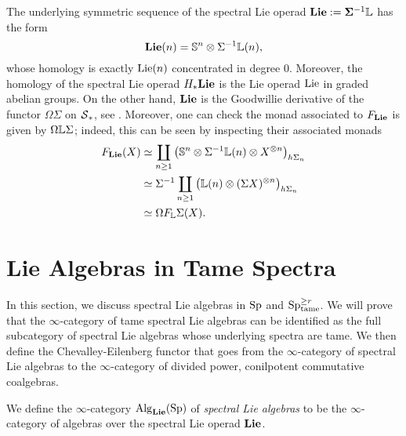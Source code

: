 \begin{remark}
\label{Remark on shifted Lie operads}
The underlying symmetric sequence of the spectral Lie operad $\mathbf{Lie}:= \mathbf{\Sigma}^{-1}{\mathbb{L}}$
	has the form 	
	$$
	\mathbf{Lie}(n)= {\mathbb{S}}^{n} \otimes \Sigma^{-1} {\mathbb{L}}(n),
	$$
	whose homology is exactly $\operatorname{Lie}(n)$ concentrated in degree $0$.
	Moreover, the homology of the spectral Lie operad $H_{*}\mathbf{Lie}$ is the Lie operad $\operatorname{Lie}$ in graded abelian groups.
	On the other hand, $\mathbf{Lie}$ is the Goodwillie derivative of the functor $\Omega\Sigma$ on $\operatorname{\mathcal{S}}_*$, see \cite[Section 8]{GoodwillieIII}.
	Moreover, one can check the monad associated to $F_{\mathbf{Lie}}$ is given by $\Omega{\mathbb{L}} \Sigma$; indeed, this can be seen by inspecting their associated monads
	\begin{align*}
		F_{\mathbf{Lie}}(X) &\simeq \coprod_{n\geq 1}
		\big(
		{\mathbb{S}}^{n} \otimes \Sigma^{-1}{\mathbb{L}}(n) 
		\otimes X^{\otimes n}
		\big)_{h\Sigma_n}\\
		& \simeq 
		\Sigma^{-1}
		\coprod_{n\geq 1}
		\big(
		{\mathbb{L}}(n) 
		\otimes (\Sigma X)^{\otimes n}
		\big)_{h\Sigma_n}\\
		& \simeq 
		\Omega F_{{\mathbb{L}}}\Sigma(X).
	\end{align*}	
\end{remark}






\section{Lie Algebras in Tame Spectra}

In this section, we discuss spectral Lie algebras in $\operatorname{Sp}$ and $\operatorname{Sp}^{\geq r}_{\operatorname{tame}}$. We will prove that the $\infty$-category of tame spectral Lie algebras can be identified as the full subcategory of spectral Lie algebras whose underlying spectra are tame.
We then define the Chevalley-Eilenberg functor that goes from the $\infty$-category of spectral Lie algebras to the $\infty$-category of divided power, conilpotent commutative coalgebras.


\begin{definition}
\label{Spectral Lie operad}
We define the $\infty$-category $\operatorname{Alg}_{\mathbf{Lie}}(\operatorname{Sp})$ of \emph{spectral Lie algebras} to be the $\infty$-category of algebras over the spectral Lie operad $\mathbf{Lie}$.
\end{definition}


